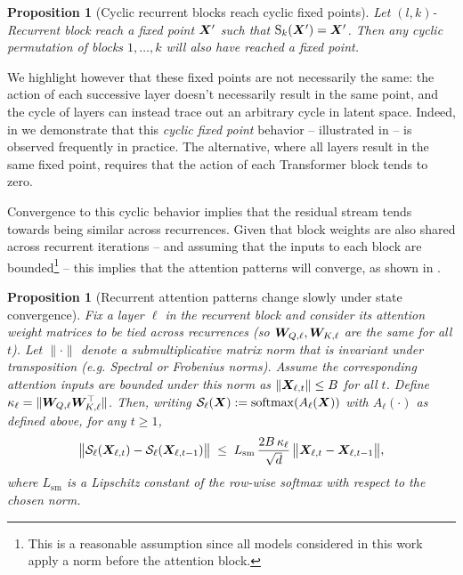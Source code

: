 \documentclass{article}
\theoremstyle{plain}
\newtheorem{proposition}[theorem]{Proposition}
\theoremstyle{definition}
\theoremstyle{remark}
\begin{document}
\begin{proposition}[Cyclic recurrent blocks reach cyclic fixed points]\label{prop:cyclic_fixed_point}
    Let $(l, k)$-Recurrent block reach a fixed point ${\bm{X}}'$ such that $\operatorname{S}_k({\bm{X}}') = {\bm{X}}'$. Then any cyclic permutation of blocks $1, \dots, k$ will also have reached a fixed point.
\end{proposition}

We highlight however that these fixed points are not necessarily the same: the action of each successive layer doesn't necessarily result in the same point, and the cycle of layers can instead trace out an arbitrary cycle in latent space. Indeed, in  we demonstrate that this \emph{cyclic fixed point} behavior -- illustrated in  -- is observed frequently in practice. The alternative, where all layers result in the same fixed point, requires that the action of each Transformer block tends to zero.


Convergence to this cyclic behavior implies that the residual stream tends towards being similar across recurrences. Given that block weights are also shared across recurrent iterations -- and assuming that the inputs to each block are bounded\footnote{This is a reasonable assumption since all models considered in this work apply a norm before the attention block.} -- this implies that the attention patterns will converge, as shown in .

\begin{proposition}[Recurrent attention patterns change slowly under state convergence]\label{prop:similar_attention_patterns}
Fix a layer $\ell$ in the recurrent block and consider its attention weight matrices to be tied across recurrences (so ${\bm{W}}_{Q,\ell},{\bm{W}}_{K,\ell}$ are the same for all $t$). 
Let $\|\cdot\|$ denote a submultiplicative matrix norm that is invariant under transposition (e.g. Spectral or Frobenius norms). Assume the corresponding attention inputs are bounded under this norm as $\|{\bm{X}}_{\ell,t}\|\le B$ for all $t$. Define $\kappa_\ell = \|{\bm{W}}_{Q,\ell}{\bm{W}}_{K,\ell}^\top\|$.  
Then, writing $\mathcal S_\ell({\bm{X}}):=\mathrm{softmax}(A_\ell({\bm{X}}))$ with $A_\ell(\cdot)$ as defined above, for any $t\ge 1$,
\begin{equation*}\label{eq:recurrent_attention_lip}
\big\|\mathcal S_\ell({\bm{X}}_{\ell,t})-\mathcal S_\ell({\bm{X}}_{\ell,t-1})\big\|
\;\le\;
L_{\mathrm{sm}}\,
\frac{2B\,\kappa_\ell}{\sqrt d}\,
\big\|{\bm{X}}_{\ell,t}-{\bm{X}}_{\ell,t-1}\big\|,
\end{equation*}
where $L_{\mathrm{sm}}$ is a Lipschitz constant of the row-wise softmax with respect to the chosen norm. 
\end{proposition}
\end{document}
